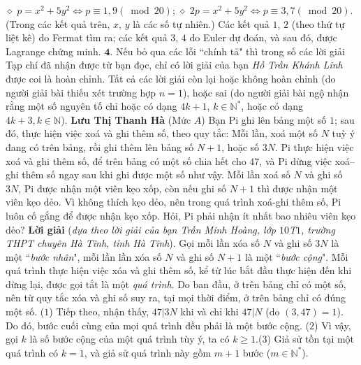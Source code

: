 \begin{multicols}{2}
	\vskip 0.05cm
	$\diamond$ $p = {x^2} + 5{y^2} \Leftrightarrow p \equiv 1,9\left( {\bmod 20} \right)$;
	\vskip 0.05cm
	$\diamond$ $2p = {x^2} + 5{y^2} \Leftrightarrow p \equiv 3,7\left( {\bmod 20} \right)$.
	\vskip 0.05cm
	(Trong các kết quả trên, $x$, $y$ là các số tự nhiên.)
	\vskip 0.05cm
	Các kết quả $1$, $2$ (theo thứ tự liệt kê) do Fermat tìm ra; các kết quả $3$, $4$ do Euler dự đoán, và sau đó, được Lagrange chứng minh.
	\vskip 0.05cm
	$\pmb{4.}$ Nếu bỏ qua các lỗi ``chính tả" thì trong số các lời giải Tạp chí đã nhận được từ bạn đọc, chỉ có lời giải của bạn \textit{Hồ Trần Khánh Linh} được coi là hoàn chỉnh. Tất cả các lời giải còn lại hoặc không hoàn chỉnh (do người giải bài thiếu xét trường hợp $n = 1$), hoặc sai (do người giải bài ngộ nhận rằng một số nguyên tố chỉ hoặc có dạng $4k + 1$, $k \in \mathbb{N^*}$, hoặc có dạng $4k + 3, k\in \mathbb{N}$).
	\vskip 0.05cm
	\hfill \textbf{\color{thachthuctoanhoc}Lưu Thị Thanh Hà}
	\vskip 0.05cm
	{}
	(Mức $A$) Bạn Pi ghi lên bảng một số $1$; sau đó, thực hiện việc xoá và ghi thêm số, theo quy tắc:  Mỗi lần, xoá một số $N$ tuỳ ý đang có trên bảng, rồi ghi thêm lên bảng số $N+1$,  hoặc số $3N$.
	\vskip 0.05cm
	Pi thực hiện việc xoá và ghi thêm số, để trên bảng có một số chia hết cho $47$, và Pi dừng việc xoá--ghi thêm số ngay sau khi ghi được một số như vậy. 
	\vskip 0.05cm
	Mỗi lần xoá số $N$ và ghi số $3N$, Pi được nhận một viên kẹo xốp, còn nếu ghi số $N+1$ thì được nhận một viên kẹo dẻo. Vì không thích kẹo dẻo, nên trong quá trình xoá-ghi thêm số, Pi luôn cố gắng để được nhận kẹo xốp. Hỏi, Pi phải nhận ít nhất bao nhiêu viên kẹo dẻo? 
	\vskip 0.05cm
	\textbf{\color{thachthuctoanhoc}Lời giải} (\textit{dựa theo lời giải của bạn Trần Minh Hoàng, lớp $10$T$1$, trường THPT chuyên Hà Tĩnh, tỉnh Hà Tĩnh}).
	\vskip 0.05cm
	Gọi mỗi lần xóa số $N$ và ghi số $3N$ là một ``\textit{bước nhân}", mỗi lần lần xóa số $N$ và ghi số $N + 1$ là một ``\textit{bước cộng}".
	\vskip 0.05cm
	Mỗi quá trình thực hiện việc xóa và ghi thêm số, kể từ lúc bắt đầu thực hiện đến khi dừng lại, được gọi tắt là một \textit{quá trình}.
	\vskip 0.05cm
	Do ban đầu, ở trên bảng chỉ có một số, nên từ quy tắc xóa và ghi số suy ra, tại mọi thời điểm, ở trên bảng chỉ có đúng một số.            \hfill ($1$)
	\vskip 0.05cm
	Tiếp theo, nhận thấy, $47|3N$  khi và chỉ khi $47|N$  (do $(3, 47) = 1$). Do đó, bước cuối cùng của mọi quá trình đều phải là một bước cộng. \hfill ($2$)
	\vskip 0.05cm
	Vì vậy, gọi $k$ là số bước cộng của một quá trình tùy ý, ta có $k \ge 1$.\hfill ($3$)
	\vskip 0.05cm
	Giả sử tồn tại một quá trình có $k = 1$, và giả sử quá trình này gồm $m + 1$ bước ($m \in \mathbb{N^*}$).

\end{multicols}

